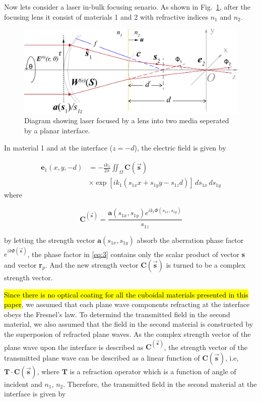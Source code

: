 \documentclass[9pt,twocolumn,twoside]{osajnl}
\begin{document}
Now lets consider a laser in-bulk focusing senario. As shown in Fig.~\ref{fig:1}, after the focusing lens it consist of materials 1 and 2 with refractive indices $n_1$ and $n_2$.

\begin{figure}
	\centering
	\includegraphics[width=\linewidth]{../AppOptics/figures/vectorDiffractionTheory.pdf}
	\caption{Diagram showing laser focused by a lens into two media seperated by a planar interface.}\label{fig:1}
\end{figure}

In material 1 and at the interface ($z=-d$), the electric field is given by

\begin{equation}\label{eq:3}
	\begin{aligned}
		\textbf{e}_1(x,y,-d)&=-\frac{ik_1}{2\pi}\iint_\Omega\textbf{C}(\vec{\mathbf{s}})\\
	&\times\exp[ik_1(s_{1x}x+s_{1y}y-s_{1z}d)]\,ds_{1x}\,ds_{1y}	
	\end{aligned}
\end{equation}
where 

\begin{equation}
	\textbf{C}^(\vec{\mathbf{s}})=\frac{\textbf{a}(s_{1x},s_{1y})e^{ik_1\Phi(s_{1x},s_{1y})}}{s_{1z}}
\end{equation}\label{eq:4}

by letting the strength vector $\mathbf{a}(s_{1x},s_{1y})$ absorb the aberration phase factor $e^{ik\Phi(\vec{\mathbf{s}})}$, the phase factor in \eqref{eq:3} contains only the scalar product of vector \textbf{s} and vector \textbf{r}$_p$. And the new strength vector $\textbf{C}(\vec{\mathbf{s}})$ is turned to be a complex strength vector.

\hl{Since there is no optical coating for all the cuboidal materials presented in this paper}, we assumed that each plane wave components refracting at the interface obeys the Fresnel's law. To determind the transmitted field in the second material, we also assumed that the field in the second material is constructed by the superposion of refracted plane waves. As the complex strength vector of the plane wave upon the interface is described as $\textbf{C}^(\vec{\textbf{s}})$, the strength vector of the transmitted plane wave can be described as a linear function of $\textbf{C}(\vec{\textbf{s}})$, i.e, $\textbf{T}\cdot\textbf{C}(\vec{\textbf{s}})$, where $\mathbf{T}$ is a refraction operator which is a function of angle of incident and $n_1$, $n_2$. Therefore, the transmitted field in the second material at the interface is given by 
\end{document}
